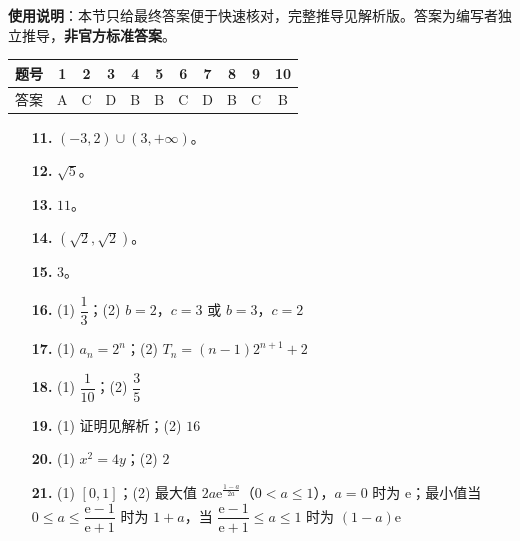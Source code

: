 
\begin{gknotice}
\textbf{使用说明}：本节只给最终答案便于快速核对，完整推导见解析版。答案为编写者独立推导，\textbf{非官方标准答案}。
\end{gknotice}

\begin{center}\begin{tabular}{ccccccccccc}
\toprule
题号 & 1 & 2 & 3 & 4 & 5 & 6 & 7 & 8 & 9 & 10 \\
\midrule
答案 & A & C & D & B & B & C & D & B & C & B \\
\bottomrule
\end{tabular}\end{center}

\begin{itemize}[leftmargin=2.6em]
  \item[\textbf{11.}] $(-3,2)\cup(3,+\infty)$。
  \item[\textbf{12.}] $\sqrt5$。
  \item[\textbf{13.}] $11$。
  \item[\textbf{14.}] $(\sqrt2,\sqrt2)$。
  \item[\textbf{15.}] $3$。
\end{itemize}

\begin{itemize}[leftmargin=2.6em]
  \item[\textbf{16.}] (1) $\dfrac13$；(2) $b=2$，$c=3$ 或 $b=3$，$c=2$
  \item[\textbf{17.}] (1) $a_n=2^n$；(2) $T_n=(n-1)2^{n+1}+2$
  \item[\textbf{18.}] (1) $\dfrac1{10}$；(2) $\dfrac35$
  \item[\textbf{19.}] (1) 证明见解析；(2) $16$
  \item[\textbf{20.}] (1) $x^2=4y$；(2) $2$
  \item[\textbf{21.}] (1) $[0,1]$；(2) 最大值 $2a\mathrm e^{\frac{1-a}{2a}}$（$0<a\leqslant1$），$a=0$ 时为 $\mathrm e$；最小值当 $0\leqslant a\leqslant\dfrac{\mathrm e-1}{\mathrm e+1}$ 时为 $1+a$，当 $\dfrac{\mathrm e-1}{\mathrm e+1}\leqslant a\leqslant1$ 时为 $(1-a)\mathrm e$
\end{itemize}
